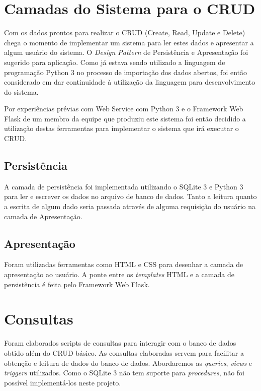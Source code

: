 \documentclass[12pt]{article}
\begin{document}
	\section{Camadas do Sistema para o CRUD}
	\label{sec:camadas}
	
	Com os dados prontos para realizar o CRUD (Create, Read, Update e Delete) chega o momento de implementar um sistema para ler estes dados e apresentar a algum usuário do sistema. O \textit{Design Pattern} de Persistência e Apresentação foi sugerido para aplicação. Como já estava sendo utilizado a linguagem de programação Python 3 no processo de importação dos dados abertos, foi então considerado em dar continuidade à utilização da linguagem para desenvolvimento do sistema.
	
	Por experiências prévias com Web Service com Python 3 e o Framework Web Flask de um membro da equipe que produziu este sistema foi então decidido a utilização destas ferramentas para implementar o sistema que irá executar o CRUD.
	
	\subsection{Persistência}
	\label{sec:pers}
	
	A camada de persistência foi implementada utilizando o SQLite 3 e Python 3 para ler e escrever os dados no arquivo de banco de dados. Tanto a leitura quanto a escrita de algum dado seria passada através de alguma requisição do usuário na camada de Apresentação.
	
	\subsection{Apresentação}
	\label{sec:apt}
	
	Foram utilizadas ferramentas como HTML e CSS para desenhar a camada de apresentação ao usuário. A ponte entre os \textit{templates} HTML e a camada de persistência é feita pelo Framework Web Flask.
	
	\section{Consultas} 
	\label{sec:consultas}
	
	Foram elaborados scripts de consultas para interagir com o banco de dados obtido além do CRUD básico. As consultas elaboradas servem para facilitar a obtenção e leitura de dados do banco de dados. Abordaremos as \emph{queries}, \emph{views} e \emph{triggers} utilizados. Como o SQLite 3 não tem suporte para \emph{procedures}, não foi possível implementá-los neste projeto.
	
\end{document}
